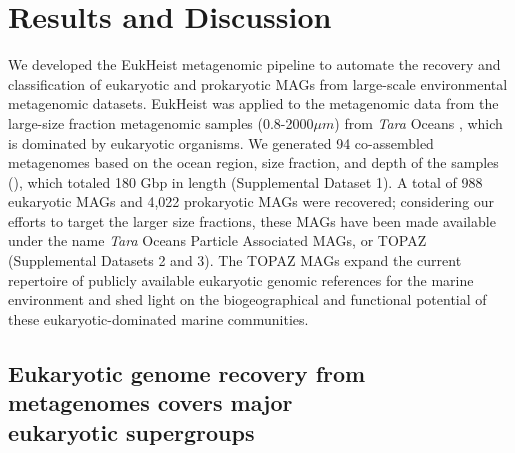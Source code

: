 \documentclass[12pt]{article}
\numberwithin{equation}{section}
\begin{document}
\section*{Results and Discussion}

We developed the EukHeist metagenomic pipeline to automate the recovery and classification of eukaryotic and prokaryotic MAGs from large-scale environmental metagenomic datasets. EukHeist was applied to the metagenomic data from the large-size fraction metagenomic samples (0.8-2000$\mu m$)  from \textit{Tara} Oceans \citep{Carradec2018global}, which is dominated by eukaryotic organisms. We generated 94 co-assembled metagenomes based on the ocean region, size fraction, and depth of the samples (), which totaled 180 Gbp in length (Supplemental Dataset 1).  A total of 988 eukaryotic MAGs and 4,022 prokaryotic MAGs were recovered; considering our efforts to target the larger size fractions, these MAGs have been made available under the name \textit{Tara} Oceans Particle Associated MAGs, or TOPAZ (Supplemental Datasets 2 and 3). The TOPAZ MAGs expand the current repertoire of publicly available eukaryotic genomic references for the marine environment and shed light on the biogeographical and functional potential of these eukaryotic-dominated marine communities. 

\subsection*{Eukaryotic genome recovery from metagenomes covers major \\ eukaryotic supergroups}
\end{document}
